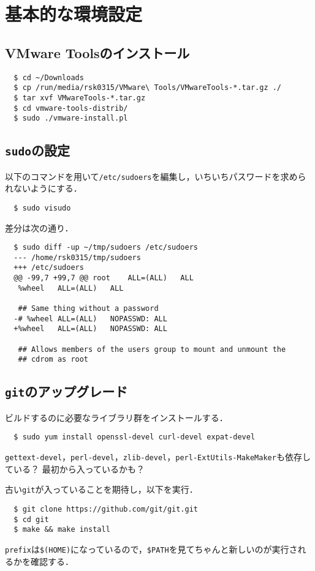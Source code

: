 \documentclass[a4paper]{jsarticle}
\begin{document}
\section{基本的な環境設定}
\subsection{VMware Toolsのインストール}
\begin{lstlisting}
  $ cd ~/Downloads
  $ cp /run/media/rsk0315/VMware\ Tools/VMwareTools-*.tar.gz ./
  $ tar xvf VMwareTools-*.tar.gz
  $ cd vmware-tools-distrib/
  $ sudo ./vmware-install.pl
\end{lstlisting}

\subsection{\texttt{sudo}の設定}
以下のコマンドを用いて\texttt{/etc/sudoers}を編集し，いちいちパスワードを求められないようにする．
\begin{lstlisting}
  $ sudo visudo
\end{lstlisting}
差分は次の通り．
\begin{lstlisting}
  $ sudo diff -up ~/tmp/sudoers /etc/sudoers
  --- /home/rsk0315/tmp/sudoers
  +++ /etc/sudoers
  @@ -99,7 +99,7 @@ root	ALL=(ALL) 	ALL
   %wheel	ALL=(ALL)	ALL
  
   ## Same thing without a password
  -# %wheel	ALL=(ALL)	NOPASSWD: ALL
  +%wheel	ALL=(ALL)	NOPASSWD: ALL
  
   ## Allows members of the users group to mount and unmount the
   ## cdrom as root
\end{lstlisting}

\subsection{\texttt{git}のアップグレード}
ビルドするのに必要なライブラリ群をインストールする．
\begin{lstlisting}
  $ sudo yum install openssl-devel curl-devel expat-devel
\end{lstlisting}
\texttt{gettext-devel}，\texttt{perl-devel}，\texttt{zlib-devel}，\texttt{perl-ExtUtils-MakeMaker}も依存している？ 最初から入っているかも？

古い\texttt{git}が入っていることを期待し，以下を実行．
\begin{lstlisting}
  $ git clone https://github.com/git/git.git
  $ cd git
  $ make && make install
\end{lstlisting}
\texttt{prefix}は\texttt{\$(HOME)}になっているので，\texttt{\$PATH}を見てちゃんと新しいのが実行されるかを確認する．
\end{document}
